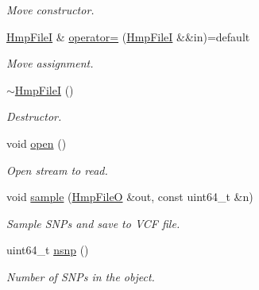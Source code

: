 \begin{DoxyCompactItemize}
\begin{DoxyCompactList}\small\item\em Move constructor. \end{DoxyCompactList}\item 
\mbox{\label{classvarfiles_1_1_hmp_file_i_a8642dfb858742cdf0b875a8f49036842}} 
\hyperlink{classvarfiles_1_1_hmp_file_i}{Hmp\+FileI} \& \hyperlink{classvarfiles_1_1_hmp_file_i_a8642dfb858742cdf0b875a8f49036842}{operator=} (\hyperlink{classvarfiles_1_1_hmp_file_i}{Hmp\+FileI} \&\&in)=default
\begin{DoxyCompactList}\small\item\em Move assignment. \end{DoxyCompactList}\item 
\mbox{\label{classvarfiles_1_1_hmp_file_i_a03704628fa632da3e263743654899b9f}} 
\hyperlink{classvarfiles_1_1_hmp_file_i_a03704628fa632da3e263743654899b9f}{$\sim$\+Hmp\+FileI} ()
\begin{DoxyCompactList}\small\item\em Destructor. \end{DoxyCompactList}\item 
\mbox{\label{classvarfiles_1_1_hmp_file_i_a6bf4de03c605ed70d74766c94f1e12ae}} 
void \hyperlink{classvarfiles_1_1_hmp_file_i_a6bf4de03c605ed70d74766c94f1e12ae}{open} ()
\begin{DoxyCompactList}\small\item\em Open stream to read. \end{DoxyCompactList}\item 
void \hyperlink{classvarfiles_1_1_hmp_file_i_afd02563de7ecb89a94e8af4110676710}{sample} (\hyperlink{classvarfiles_1_1_hmp_file_o}{Hmp\+FileO} \&out, const uint64\+\_\+t \&n)
\begin{DoxyCompactList}\small\item\em Sample S\+N\+Ps and save to V\+CF file. \end{DoxyCompactList}\item 
\mbox{\label{classvarfiles_1_1_hmp_file_i_a094c94a35655ec3a6211ebff6fffe3a2}} 
uint64\+\_\+t \hyperlink{classvarfiles_1_1_hmp_file_i_a094c94a35655ec3a6211ebff6fffe3a2}{nsnp} ()
\begin{DoxyCompactList}\small\item\em Number of S\+N\+Ps in the object. \end{DoxyCompactList}\end{DoxyCompactItemize}


